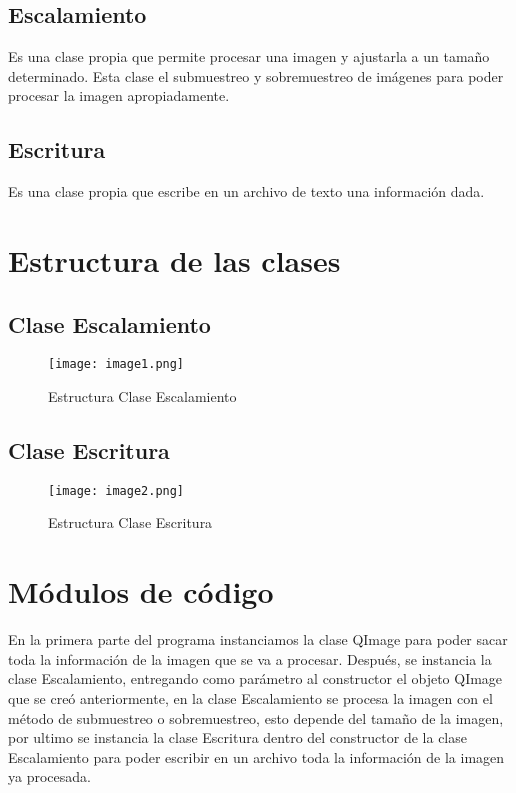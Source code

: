 \documentclass{article}
\begin{document}
\subsection{Escalamiento}
Es una clase propia que permite procesar una imagen y ajustarla a un tamaño determinado. Esta clase el submuestreo y sobremuestreo de imágenes para poder procesar la imagen apropiadamente.

\subsection{Escritura}
Es una clase propia que escribe en un archivo de texto una información dada.

\newpage
\section{Estructura de las clases}\label{intro}
\subsection{Clase Escalamiento}
\begin{figure}[h]
    \texttt{[image: image1.png]}
    \centering
    \caption{Estructura Clase Escalamiento}
    \label{fig:image1}
    \vspace{1.5cm}
    \end{figure}

\subsection{Clase Escritura}
\begin{figure}[h]
    \texttt{[image: image2.png]}
    \centering
    \caption{Estructura Clase Escritura}
    \label{fig:image}
    \vspace{1.5cm}
    \end{figure}

\newpage    
\section{Módulos de código}\label{intro}
En la primera parte del programa instanciamos la clase QImage para poder sacar toda la información de la imagen que se va a procesar. Después, se instancia la clase Escalamiento, entregando como parámetro al constructor el objeto QImage que se creó anteriormente, en la clase Escalamiento se procesa la imagen con el método de submuestreo o sobremuestreo, esto depende del tamaño de la imagen, por ultimo se instancia la clase Escritura dentro del constructor de la clase Escalamiento para poder escribir en un archivo toda la información de la imagen ya procesada.
\end{document}
